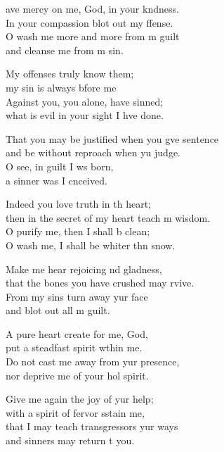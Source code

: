 \settowidth{\versewidth}{That you may be justified when you give sentence *}
\begin{psalmverse}%
  \begin{patverse}
    ave mercy on me, God, in your k\pointup{\i}ndness.\Med\\
In your compassion blot out my ffense.\\
O wash me more and more from m guilt\Med\\
and cleanse me from m sin.

My offenses truly  know them;\Med\\
my sin is always bfore me\\
Against you, you alone, have  sinned;\Med\\
what is evil in your sight I hve done.

That you may be justified when you g\pointup{\i}ve sentence\Med\\
and be without reproach when yu judge.\\
O see, in guilt I ws born,\Med\\
a sinner was I cnceived.

Indeed you love truth in th heart;\Med\\
then in the secret of my heart teach m wisdom.\\
O purify me, then I shall b clean;\Med\\
O wash me, I shall be whiter thn snow.

Make me hear rejoicing nd gladness,\Med\\
that the bones you have crushed may rvive.\\
From my sins turn away yur face\Med\\
and blot out all m guilt.

A pure heart create for me,  God,\Med\\
put a steadfast spirit w\pointup{\i}thin me.\\
Do not cast me away from yur presence,\Med\\
nor deprive me of your hol spirit.

Give me again the joy of yur help;\Med\\
with a spirit of fervor sstain me,\\
that I may teach transgressors yur ways\Med\\
and sinners may return t you.


\end{patverse}
\end{psalmverse}
